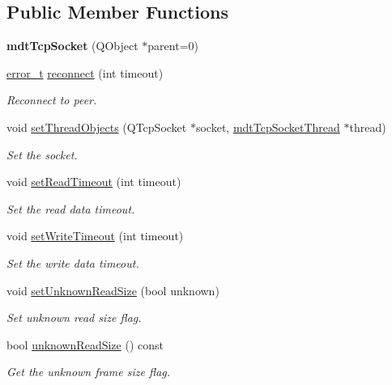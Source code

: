 \subsection*{Public Member Functions}
\begin{DoxyCompactItemize}
\item 
\hypertarget{classmdt_tcp_socket_aeed1a50725a8e61f86de2bf67a92feb8}{
{\bfseries mdtTcpSocket} (QObject $\ast$parent=0)}
\label{classmdt_tcp_socket_aeed1a50725a8e61f86de2bf67a92feb8}

\item 
\hyperlink{classmdt_abstract_port_ad4121bb930c95887e77f8bafa065a85e}{error\_\-t} \hyperlink{classmdt_tcp_socket_a6a9990696ea459601b17ddbffe5b0703}{reconnect} (int timeout)
\begin{DoxyCompactList}\small\item\em Reconnect to peer. \end{DoxyCompactList}\item 
void \hyperlink{classmdt_tcp_socket_a8a57e4b49f56c301c5f8d7a9ec191e87}{setThreadObjects} (QTcpSocket $\ast$socket, \hyperlink{classmdt_tcp_socket_thread}{mdtTcpSocketThread} $\ast$thread)
\begin{DoxyCompactList}\small\item\em Set the socket. \end{DoxyCompactList}\item 
void \hyperlink{classmdt_tcp_socket_aae23057f2e0ee326d0fee78ffe3f00f9}{setReadTimeout} (int timeout)
\begin{DoxyCompactList}\small\item\em Set the read data timeout. \end{DoxyCompactList}\item 
void \hyperlink{classmdt_tcp_socket_ac59d2dfdf405b5382f0f20d5b9f75fd0}{setWriteTimeout} (int timeout)
\begin{DoxyCompactList}\small\item\em Set the write data timeout. \end{DoxyCompactList}\item 
void \hyperlink{classmdt_tcp_socket_a3fd73142279a256c984141cb16acf49e}{setUnknownReadSize} (bool unknown)
\begin{DoxyCompactList}\small\item\em Set unknown read size flag. \end{DoxyCompactList}\item 
bool \hyperlink{classmdt_tcp_socket_a0a131c24527c76dbbc0acfb8cbd6f336}{unknownReadSize} () const 
\begin{DoxyCompactList}\small\item\em Get the unknown frame size flag. \end{DoxyCompactList}\item 

\end{DoxyCompactItemize}
